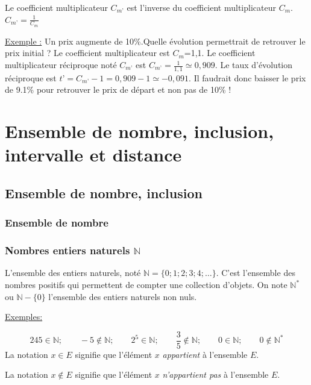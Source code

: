 \documentclass[french]{book}
\newcommand{\N}{\mathbb {N}}
\begin{document}
\begin{prop}
Le coefficient multiplicateur $C_{m’}$ est l’inverse du coefficient multiplicateur $C_{m}$. $C_{m’}=\frac{1}{C_m}$
\end{prop}

\underline{Exemple :} Un prix augmente de 10\%.Quelle évolution permettrait de retrouver le prix initial ?
Le coefficient multiplicateur est $C_m$=1,1. Le coefficient multiplicateur réciproque noté $C_{m’}$ est $C_{m’}=\frac{1}{1,1}\simeq 0,909$.
Le taux d’évolution réciproque est $t’=C_{m’}-1=0,909-1 \simeq - 0,091$. Il faudrait donc baisser le prix de 9.1\% pour retrouver le prix de départ et non pas de 10\% !

\chapter{Ensemble de nombre, inclusion, intervalle et distance}

\section{Ensemble de nombre, inclusion}
\subsection{Ensemble de nombre}

\subsection*{Nombres entiers naturels $\N$}

\begin{defn}
L'ensemble des  entiers naturels, noté $\mathbb{N} = \{0;1;2;3;4;\dots\}$.
C'est l'ensemble des nombres positifs  qui permettent de compter une collection d'objets.
On note $\N^*$ ou $\N-\{0\}$ l'ensemble des entiers naturels non nuls.
\end{defn}



\medskip

\underline{Exemples:}


\[245 \in \N ;\qquad -5 \notin \N ;\qquad  2^5 \in \N ;\qquad \dfrac{3}{5} \notin\N; \qquad 0 \in\N; \qquad 0 \notin\N^*\] 
La notation \og $x\in E$\fg{} signifie que l'élément $x$ \emph{appartient} à l'ensemble $E$.

 La notation \og $x\notin E$\fg{} signifie que l'élément $x$ \emph{n'appartient pas} à l'ensemble $E$.
 
\end{document}
